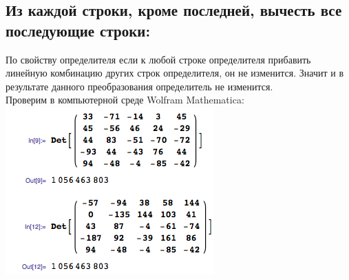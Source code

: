\subsection{Из каждой строки, кроме последней, вычесть все последующие строки:}
По свойству определителя если к любой строке определителя прибавить линейную комбинацию других строк определителя, он не изменится.
Значит и в результате данного преобразования определитель не изменится.
\\[1em]
Проверим в компьютерной среде Wolfram Mathematica:
\\
\includegraphics[scale=0.6]{task/1_38/screen2.png}
